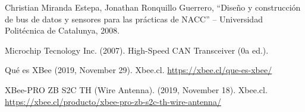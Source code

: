 \begin{thebibliography}{99}
 Christian Miranda Estepa, Jonathan Ronquillo Guerrero, “Diseño y construcción de bus de datos y sensores para las prácticas de NACC” – Universidad Politécnica de Catalunya, 2008.

 Microchip Tecnology Inc. (2007). High-Speed CAN Transceiver (0a ed.).


 Qué es XBee (2019, November 29). Xbee.cl. \url{https://xbee.cl/que-es-xbee/} 

 XBee-PRO ZB S2C TH (Wire Antenna). (2019, November 18). Xbee.cl. \url{ https://xbee.cl/producto/xbee-pro-zb-s2c-th-wire-antenna/}




 
\end{thebibliography}